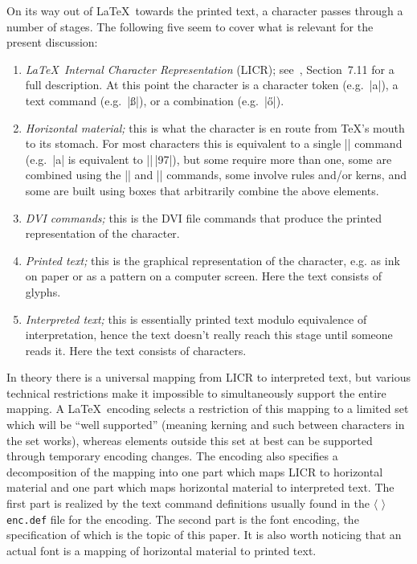 \documentclass[a4paper]{article}
\makeatletter
\DeclareRobustCommand\meta[1]{%
   \ensuremath{\langle}%
   \sbox{\z@}{%
      \setlanguage\l@nohyphenation
      \normalfont\itshape #1\/%
      \setlanguage\language
   }%
   \unhbox\z@
   \ensuremath{\rangle}%
}
\makeatother
\begin{document}
On its way out of \LaTeX\ towards the printed text, a character passes 
through a number of stages. The following five seem to cover what is 
relevant for the present discussion:
\begin{enumerate}
  \item \emph{\LaTeX\ Internal Character Representation} (LICR); 
    see~\cite{LaTeXCompanion}, Section~7.11 for a full description. 
    At this point the character is a character token (e.g.~|a|), 
    a text command (e.g.~|\ss|), or a combination (e.g.~|\H{o}|).
  \item \emph{Horizontal material;} this is what the character is 
    en route from \TeX's mouth to its stomach. For most characters 
    this is equivalent to a single |\char| command (e.g.\ |a| is 
    equivalent to |\char|\,|97|), but some require more than one, some 
    are combined using the |\accent| and |\char| commands, some 
    involve rules and\slash or kerns, and some are built using boxes 
    that arbitrarily combine the above elements.
  \item \emph{DVI commands;} this is the DVI file commands that 
    produce the printed representation of the character.
  \item \emph{Printed text;} this is the graphical representation of 
    the character, e.g. as ink on paper or as a pattern on a computer 
    screen. Here the text consists of glyphs.
  \item \emph{Interpreted text;} this is essentially printed text 
    modulo equivalence of interpretation, hence the text doesn't really 
    reach this stage until someone reads it. Here the text consists of 
    characters.
\end{enumerate}

In theory there is a universal mapping from LICR to interpreted text, 
but various technical restrictions make it impossible to simultaneously 
support the entire mapping. A \LaTeX\ encoding selects a restriction 
of this mapping to a limited set which will be ``well supported'' 
(meaning kerning and such between characters in the set works), whereas 
elements outside this set at best can be supported through temporary 
encoding changes. The encoding also specifies a decomposition of the 
mapping into one part which maps LICR to horizontal material and one 
part which maps horizontal material to interpreted text. The first 
part is realized by the text command definitions usually found in the 
\meta{enc}\texttt{enc.def} file for the encoding. The second part is 
the font encoding, the specification of which is the topic of this 
paper. It is also worth noticing that an actual font is a mapping of 
horizontal material to printed text.
\end{document}
